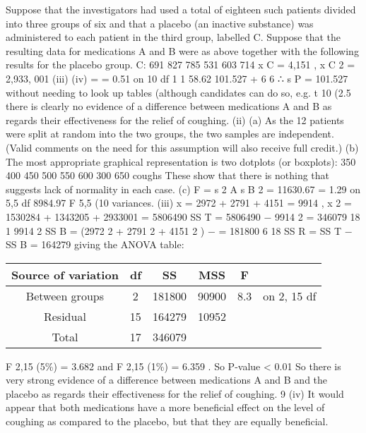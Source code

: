 \documentclass[a4paper,12pt]{article}
\begin{document}
Suppose that the investigators had used a total of eighteen such patients divided into three groups of six and that a placebo (an inactive substance) was administered to each patient in the third group, labelled C. Suppose that the resulting data for
medications A and B were as above together with the following results for the placebo
group.
C:
691
827
785
531
603
714
\sum  x C = 4,151 , \sum  x C 2 = 2,933, 001
(iii)
(iv)
=
= 0.51 on 10 df
1 1 58.62
101.527
+
6 6
∴ s P = 101.527
without needing to look up tables (although candidates can do so, e.g.
t 10 (2.5%
there is clearly no evidence of a difference between medications A and B as regards their effectiveness for the relief of coughing.
(ii)
(a) As the 12 patients were split at random into the two groups, the two samples are independent.
(Valid comments on the need for this assumption will also receive full credit.)
(b) The most appropriate graphical representation is two dotplots (or boxplots):
350
400
450
500
550
600
300
650
coughs
These show that there is nothing that suggests lack of normality in each
case.
(c)
F =
s 2 A
s B 2
=
11630.67
= 1.29 on 5,5 df
8984.97
F 5,5 (10%
variances.
(iii)
\sum  x = 2972 + 2791 + 4151 = 9914 ,
\sum  x 2 = 1530284 + 1343205 + 2933001 = 5806490
SS T = 5806490 −
9914 2
= 346079
18
1
9914 2
SS B = (2972 2 + 2791 2 + 4151 2 ) −
= 181800
6
18
SS R = SS T − SS B = 164279
giving the ANOVA table:

\begin{center}
\begin{tabular}{|c|c|c|c|c|c|} \hline
Source of variation	&	df	&	SS	&	MSS	&	F	&		\\ \hline
Between groups	&	2	&	181800	&	90900	&	8.3	&	on 2, 15 df	\\ \hline
Residual	&	15	&	164279	&	10952	&		&		\\ \hline
Total	&	17	&	346079	&		&		&		\\ \hline
\end{tabular}
\end{center}

F 2,15 (5\%) = 3.682 and F 2,15 (1\%) = 6.359 . So P-value < 0.01
So there is very strong evidence of a difference between medications A and B and the placebo as regards their effectiveness for the relief of coughing.
9
(iv) It would appear that both medications have a more beneficial effect on the level of coughing as compared to the placebo, but that they are equally beneficial.
\end{document}
